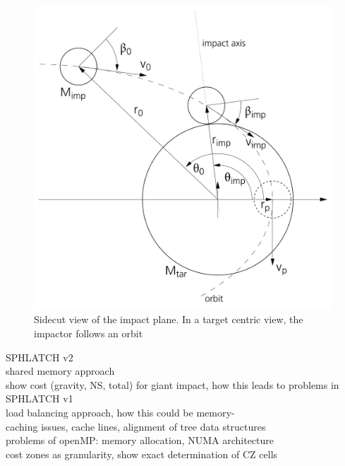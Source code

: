 \begin{figure}[htbp]
\begin{center}
\includegraphics[scale=0.6]{29ssc.pdf}
\caption{Sidecut view of the impact plane. In a target centric view, the impactor follows an orbit }
\label{ch02_fig29}
\end{center}
\end{figure}




SPHLATCH v2\\
shared memory approach\\
show cost (gravity, NS, total) for giant impact, how this leads to problems in SPHLATCH v1\\
load balancing approach, how this could be memory-\\
caching issues, cache lines, alignment of tree data structures\\
problems of openMP: memory allocation, NUMA architecture\\
cost zones as granularity, show exact determination of CZ cells\\






